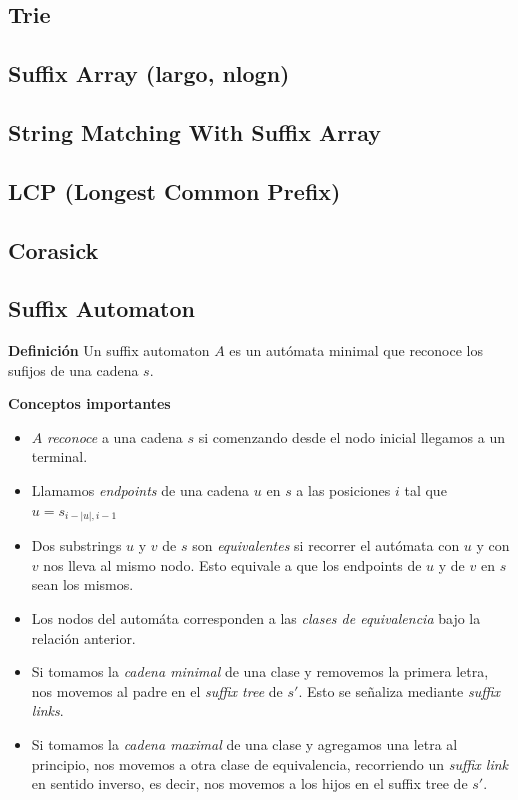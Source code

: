 \subsection{Trie}
\subsection{Suffix Array (largo, nlogn)}
\subsection{String Matching With Suffix Array}
\subsection{LCP (Longest Common Prefix)}
\subsection{Corasick}
\subsection{Suffix Automaton}
\textbf{Definición}
Un suffix automaton $A$ es un autómata minimal que reconoce los sufijos de una 
cadena $s$.

\textbf{Conceptos importantes}
\begin{itemize}
    \item $A$ \emph{reconoce} a una cadena $s$ si comenzando desde el nodo inicial llegamos a un 
    terminal.

    \item Llamamos \emph{endpoints} de una cadena $u$ en $s$ a las posiciones $i$ tal que 
    $u = s_{i-|u|, i-1}$

    \item Dos substrings $u$ y $v$ de $s$ son \emph{equivalentes} si recorrer el autómata con $u$ 
    y con $v$ nos lleva al mismo nodo. Esto equivale a que los endpoints de $u$ y de
    $v$ en $s$ sean los mismos. 

    \item Los nodos del automáta corresponden a las \emph{clases de equivalencia} bajo la
    relación anterior.

    \item Si tomamos la \emph{cadena minimal} de una clase y removemos la primera letra,
    nos movemos al padre en el \emph{suffix tree} de $s'$. Esto se señaliza mediante \emph{suffix links}.
        
    \item Si tomamos la \emph{cadena maximal} de una clase y agregamos una letra al principio,
    nos movemos a otra clase de equivalencia, recorriendo un \emph{suffix link} en sentido inverso,
    es decir, nos movemos a los hijos en el suffix tree de $s'$.
\end{itemize}

